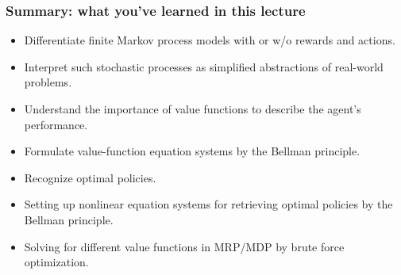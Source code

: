 
\begin{frame}
\frametitle{Summary: what you've learned in this lecture}
\begin{itemize}
	\item Differentiate finite Markov process models with or w/o rewards and actions.\pause
	\item Interpret such stochastic processes as simplified abstractions of real-world problems.\pause
	\item Understand the importance of value functions to describe the agent's performance. \pause
	\item Formulate value-function equation systems by the Bellman principle.\pause
	\item Recognize optimal policies.\pause
	\item Setting up nonlinear equation systems for retrieving optimal policies by the Bellman principle.\pause
	\item Solving for different value functions in MRP/MDP by brute force optimization.
\end{itemize}
\end{frame}
